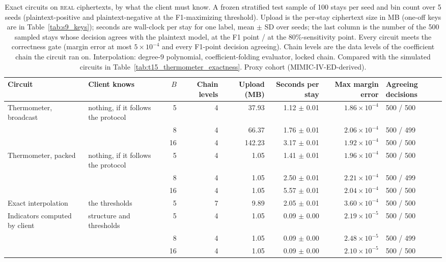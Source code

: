 \begin{table}[t]
\centering
\caption{Exact circuits on \textsc{real} ciphertexts, by what the client must know. A frozen stratified test sample of 100 stays per seed and bin count over 5 seeds (plaintext-positive and plaintext-negative at the F1-maximizing threshold). Upload is the per-stay ciphertext size in MB (one-off keys are in Table~\ref{tab:s9_keys}); seconds are wall-clock per stay for one label, mean $\pm$ SD over seeds; the last column is the number of the 500 sampled stays whose decision agrees with the plaintext model, at the F1 point / at the 80\%-sensitivity point. Every circuit meets the correctness gate (margin error at most $5\times10^{-4}$ and every F1-point decision agreeing). Chain levels are the data levels of the coefficient chain the circuit ran on. Interpolation: degree-9 polynomial, coefficient-folding evaluator, locked chain. Compared with the simulated circuits in Table~\ref{tab:t15_thermometer_exactness}. Proxy cohort (MIMIC-IV-ED-derived).}
\label{tab:t14_thermometer_real}
\begin{tabular}{llrrrrrl}
\toprule
Circuit & Client knows & $B$ & Chain levels & Upload (MB) & Seconds per stay & Max margin error & Agreeing decisions \\
\midrule
Thermometer, broadcast & nothing, if it follows the protocol & 5 & 4 & 37.93 & 1.12 $\pm$ 0.01 & $1.86 \times 10^{-4}$ & 500 / 500 \\
 &  & 8 & 4 & 66.37 & 1.76 $\pm$ 0.01 & $2.06 \times 10^{-4}$ & 500 / 499 \\
 &  & 16 & 4 & 142.23 & 3.17 $\pm$ 0.01 & $1.92 \times 10^{-4}$ & 500 / 500 \\
Thermometer, packed & nothing, if it follows the protocol & 5 & 4 & 1.05 & 1.41 $\pm$ 0.01 & $1.96 \times 10^{-4}$ & 500 / 500 \\
 &  & 8 & 4 & 1.05 & 2.50 $\pm$ 0.01 & $2.21 \times 10^{-4}$ & 500 / 499 \\
 &  & 16 & 4 & 1.05 & 5.57 $\pm$ 0.01 & $2.04 \times 10^{-4}$ & 500 / 500 \\
\midrule
Exact interpolation & the thresholds & 5 & 7 & 9.89 & 2.05 $\pm$ 0.01 & $3.60 \times 10^{-4}$ & 500 / 500 \\
\midrule
Indicators computed by client & structure and thresholds & 5 & 4 & 1.05 & 0.09 $\pm$ 0.00 & $2.19 \times 10^{-5}$ & 500 / 500 \\
 &  & 8 & 4 & 1.05 & 0.09 $\pm$ 0.00 & $2.48 \times 10^{-5}$ & 500 / 499 \\
 &  & 16 & 4 & 1.05 & 0.09 $\pm$ 0.00 & $2.10 \times 10^{-5}$ & 500 / 500 \\
\bottomrule
\end{tabular}
\end{table}
